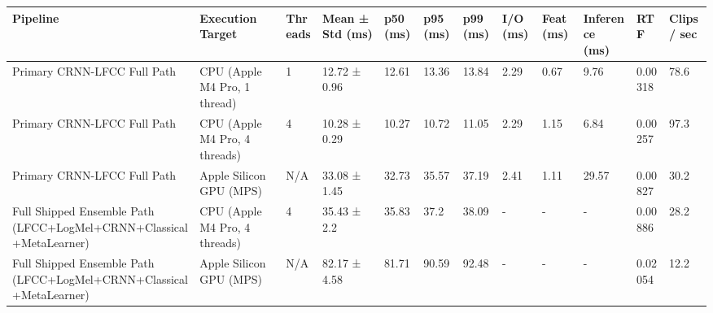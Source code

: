 \begin{tabular}{llllllllllll}
\toprule
Pipeline & Execution Target & Threads & Mean ± Std (ms) & p50 (ms) & p95 (ms) & p99 (ms) & I/O (ms) & Feat (ms) & Inference (ms) & RTF & Clips / sec \\
\midrule
Primary CRNN-LFCC Full Path & CPU (Apple M4 Pro, 1 thread) & 1 & 12.72 ± 0.96 & 12.61 & 13.36 & 13.84 & 2.29 & 0.67 & 9.76 & 0.00318 & 78.6 \\
Primary CRNN-LFCC Full Path & CPU (Apple M4 Pro, 4 threads) & 4 & 10.28 ± 0.29 & 10.27 & 10.72 & 11.05 & 2.29 & 1.15 & 6.84 & 0.00257 & 97.3 \\
Primary CRNN-LFCC Full Path & Apple Silicon GPU (MPS) & N/A & 33.08 ± 1.45 & 32.73 & 35.57 & 37.19 & 2.41 & 1.11 & 29.57 & 0.00827 & 30.2 \\
Full Shipped Ensemble Path (LFCC+LogMel+CRNN+Classical+MetaLearner) & CPU (Apple M4 Pro, 4 threads) & 4 & 35.43 ± 2.2 & 35.83 & 37.2 & 38.09 & - & - & - & 0.00886 & 28.2 \\
Full Shipped Ensemble Path (LFCC+LogMel+CRNN+Classical+MetaLearner) & Apple Silicon GPU (MPS) & N/A & 82.17 ± 4.58 & 81.71 & 90.59 & 92.48 & - & - & - & 0.02054 & 12.2 \\
\bottomrule
\end{tabular}
